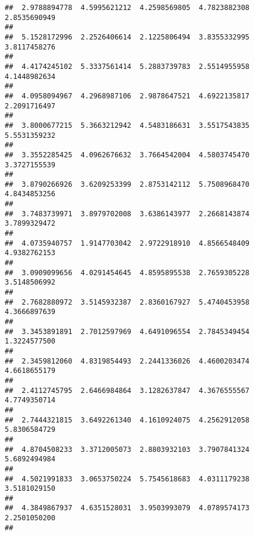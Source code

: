 \documentclass[]{article}
\begin{document}
\begin{verbatim}
##  2.9788894778  4.5995621212  4.2598569805  4.7823882308  2.8535690949 
##                                                                       
##  5.1528172996  2.2526406614  2.1225806494  3.8355332995  3.8117458276 
##                                                                       
##  4.4174245102  5.3337561414  5.2883739783  2.5514955958  4.1448982634 
##                                                                       
##  4.0958094967  4.2968987106  2.9878647521  4.6922135817  2.2091716497 
##                                                                       
##  3.8000677215  5.3663212942  4.5483186631  3.5517543835  5.5531359232 
##                                                                       
##  3.3552285425  4.0962676632  3.7664542004  4.5803745470  3.3727155539 
##                                                                       
##  3.8790266926  3.6209253399  2.8753142112  5.7508968470  4.8434853256 
##                                                                       
##  3.7483739971  3.8979702008  3.6386143977  2.2668143874  3.7899329472 
##                                                                       
##  4.0735940757  1.9147703042  2.9722918910  4.8566548409  4.9382762153 
##                                                                       
##  3.0909099656  4.0291454645  4.8595895538  2.7659305228  3.5148506992 
##                                                                       
##  2.7682880972  3.5145932387  2.8360167927  5.4740453958  4.3666897639 
##                                                                       
##  3.3453891891  2.7012597969  4.6491096554  2.7845349454  1.3224577500 
##                                                                       
##  2.3459812060  4.8319854493  2.2441336026  4.4600203474  4.6618655179 
##                                                                       
##  2.4112745795  2.6466984864  3.1282637847  4.3676555567  4.7749350714 
##                                                                       
##  2.7444321815  3.6492261340  4.1610924075  4.2562912058  5.8306584729 
##                                                                       
##  4.8704508233  3.3712005073  2.8803932103  3.7907841324  5.6892494984 
##                                                                       
##  4.5021991833  3.0653750224  5.7545618683  4.0311179238  3.5181029150 
##                                                                       
##  4.3849867937  4.6351528031  3.9503993079  4.0789574173  2.2501050200 
##                                                                       

\end{verbatim}
\end{document}
